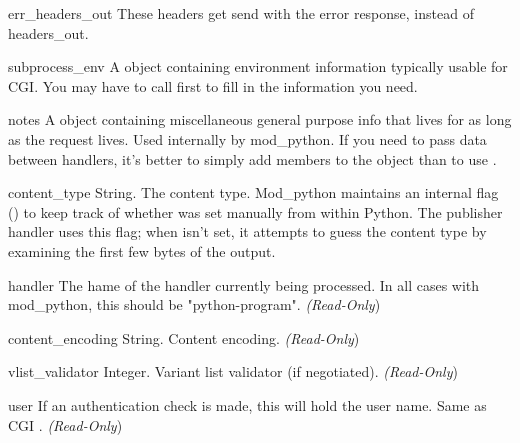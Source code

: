 \begin{memberdesc}[Request]{err_headers_out}
These headers get send with the error response, instead of
headers_out.
\end{memberdesc}

\begin{memberdesc}[Request]{subprocess_env}
A  object containing environment information typically usable for CGI.
You may have to call  first to fill in the information
you need.
\end{memberdesc}

\begin{memberdesc}[Request]{notes}
A  object containing miscellaneous general purpose info that lives for
as long as the request lives. Used internally by mod_python. If you need to pass
data between handlers, it's better to simply add members to the 
object than to use .
\end{memberdesc}

\begin{memberdesc}[Request]{content_type}
String. The content type. Mod_python maintains an internal flag
() to keep track of whether
 was set manually from within Python. The
publisher handler uses this flag; when  isn't
set, it attempts to guess the content type by examining the
first few bytes of the output.
\end{memberdesc}

\begin{memberdesc}[Request]{handler}
The hame of the handler currently being processed. In all cases with
mod_python, this should be "python-program".
\emph{(Read-Only})
\end{memberdesc}

\begin{memberdesc}[Request]{content_encoding}
String. Content encoding.
\emph{(Read-Only})
\end{memberdesc}

\begin{memberdesc}[Request]{vlist_validator}
Integer. Variant list validator (if negotiated).
\emph{(Read-Only})
\end{memberdesc}

\begin{memberdesc}[Request]{user}
If an authentication check is made, this will hold the user
name. Same as CGI .
\emph{(Read-Only})
\end{memberdesc}

